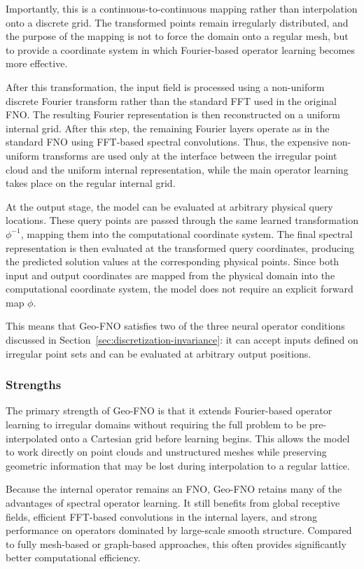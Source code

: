Importantly, this is a continuous-to-continuous mapping rather than interpolation onto a discrete grid. The transformed points remain irregularly distributed, and the purpose of the mapping is not to force the domain onto a regular mesh, but to provide a coordinate system in which Fourier-based operator learning becomes more effective.

After this transformation, the input field is processed using a non-uniform discrete Fourier transform rather than the standard FFT used in the original FNO. The resulting Fourier representation is then reconstructed on a uniform internal grid. After this step, the remaining Fourier layers operate as in the standard FNO using FFT-based spectral convolutions. Thus, the expensive non-uniform transforms are used only at the interface between the irregular point cloud and the uniform internal representation, while the main operator learning takes place on the regular internal grid.

At the output stage, the model can be evaluated at arbitrary physical query locations. These query points are passed through the same learned transformation \(\phi^{-1}\), mapping them into the computational coordinate system. The final spectral representation is then evaluated at the transformed query coordinates, producing the predicted solution values at the corresponding physical points. Since both input and output coordinates are mapped from the physical domain into the computational coordinate system, the model does not require an explicit forward map \(\phi\).

This means that Geo-FNO satisfies two of the three neural operator conditions discussed in Section~\ref{sec:discretization-invariance}: it can accept inputs defined on irregular point sets and can be evaluated at arbitrary output positions.



\subsubsection{Strengths}

The primary strength of Geo-FNO is that it extends Fourier-based operator learning to irregular domains without requiring the full problem to be pre-interpolated onto a Cartesian grid before learning begins. This allows the model to work directly on point clouds and unstructured meshes while preserving geometric information that may be lost during interpolation to a regular lattice.

Because the internal operator remains an FNO, Geo-FNO retains many of the advantages of spectral operator learning. It still benefits from global receptive fields, efficient FFT-based convolutions in the internal layers, and strong performance on operators dominated by large-scale smooth structure. Compared to fully mesh-based or graph-based approaches, this often provides significantly better computational efficiency.

